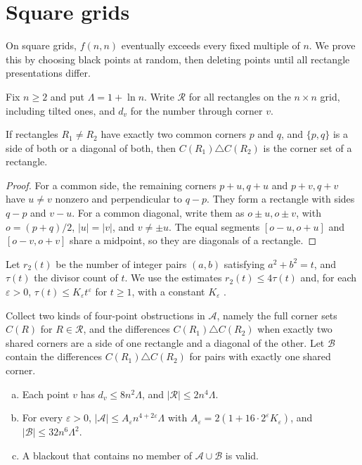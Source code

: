 \section{Square grids}\label{sec:square}

On square grids, $f(n,n)$ eventually exceeds every fixed multiple of $n$.
We prove this by choosing black points at random, then deleting points
until all rectangle presentations differ.

Fix $n\ge2$ and put $\Lambda=1+\ln n$.
Write $\mathcal R$ for all rectangles on the $n\times n$ grid,
including tilted ones, and $d_v$ for the number through corner $v$.

\begin{lemma}\label{lem:compress}
If rectangles $R_1\ne R_2$ have exactly two common corners $p$ and $q$, and $\{p,q\}$ is a side of both or a diagonal of both, then $C(R_1)\triangle C(R_2)$ is the corner set of a rectangle.
\end{lemma}

\begin{proof}
For a common side, the remaining corners $p+u,q+u$ and $p+v,q+v$
have $u\ne v$ nonzero and perpendicular to $q-p$. They form a
rectangle with sides $q-p$ and $v-u$.
For a common diagonal, write them as $o\pm u,o\pm v$, with
$o=(p+q)/2$, $|u|=|v|$, and $v\ne\pm u$.
The equal segments $[o-u,o+u]$ and $[o-v,o+v]$ share a midpoint,
so they are diagonals of a rectangle.
\end{proof}

Let $r_2(t)$ be the number of integer pairs $(a,b)$ satisfying
$a^2+b^2=t$, and $\tau(t)$ the divisor count of $t$.
We use the estimates $r_2(t)\le4\tau(t)$ and, for each
$\varepsilon>0$, $\tau(t)\le K_\varepsilon t^\varepsilon$ for $t\ge1$,
with a constant $K_\varepsilon$
\cite[Sections~16.9, 16.10, and~18.1]{hardywright2008}.

Collect two kinds of four-point obstructions in $\mathcal A$,
namely the full corner sets $C(R)$ for $R\in\mathcal R$, and the
differences $C(R_1)\triangle C(R_2)$ when exactly two shared corners
are a side of one rectangle and a diagonal of the other.
Let $\mathcal B$ contain the differences $C(R_1)\triangle C(R_2)$
for pairs with exactly one shared corner.

\begin{lemma}\label{lem:counts}
\leavevmode
\begin{enumerate}[(a)]
\item Each point $v$ has $d_v\le8n^2\Lambda$, and $|\mathcal R|\le2n^4\Lambda$.
\item For every $\varepsilon>0$, $|\mathcal A|\le A_\varepsilon n^{4+2\varepsilon}\Lambda$ with $A_\varepsilon=2(1+16\cdot2^\varepsilon K_\varepsilon)$, and $|\mathcal B|\le32n^6\Lambda^2$.
\item A blackout that contains no member of $\mathcal A\cup\mathcal B$ is valid.
\end{enumerate}
\end{lemma}

